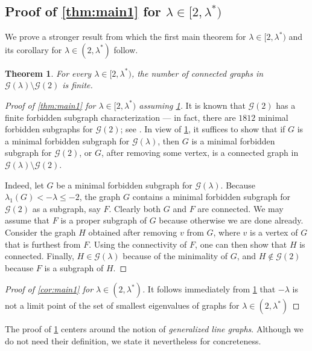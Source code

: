 \documentclass[11pt]{article}
\newtheorem{theorem}{Theorem}[section]
\theoremstyle{definition}
\theoremstyle{remark}
\newcommand{\la}{\lambda}
\newcommand{\G}{\mathcal{G}}
\newcommand{\Gl}{\G(\la)}
\begin{document}
\subsection{Proof of \texorpdfstring{\cref{thm:main1}}{the first main theorem} for \texorpdfstring{$\la \in [2, \la^*)$}{λ in [2, λ*)}} \label{sec:main1-2}

We prove a stronger result from which the first main theorem for $\la \in [2, \la^*)$ and its corollary for $\la \in (2,\la^*)$ follow.

\begin{theorem} \label{thm:main1-2}
    For every $\la \in [2, \la^*)$, the number of connected graphs in $\Gl \setminus \G(2)$ is finite.
\end{theorem}

\begin{proof}[Proof of \cref{thm:main1} for $\la \in [2, \la^*)$ assuming \cref{thm:main1-2}] \label{proof:main1-0}
    It is known that $\G(2)$ has a finite forbidden subgraph characterization --- in fact, there are $1812$ minimal forbidden subgraphs for $\G(2)$; see \cite{BN92}. In view of \cref{thm:main1-2}, it suffices to show that if $G$ is a minimal forbidden subgraph for $\Gl$, then $G$ is a minimal forbidden subgraph for $\G(2)$, or $G$, after removing some vertex, is a connected graph in $\Gl \setminus \G(2)$.
    
    Indeed, let $G$ be a minimal forbidden subgraph for $\Gl$. Because $\la_1(G) < -\la \le -2$, the graph $G$ contains a minimal forbidden subgraph for $\G(2)$ as a subgraph, say $F$. Clearly both $G$ and $F$ are connected. We may assume that $F$ is a proper subgraph of $G$ because otherwise we are done already. Consider the graph $H$ obtained after removing $v$ from $G$, where $v$ is a vertex of $G$ that is furthest from $F$. Using the connectivity of $F$, one can then show that $H$ is connected. Finally, $H \in \Gl$ because of the minimality of $G$, and $H \not\in \G(2)$ because $F$ is a subgraph of $H$.
\end{proof}

\begin{proof}[Proof of \cref{cor:main1} for $\la \in (2,\la^*)$]
    It follows immediately from \cref{thm:main1-2} that $-\la$ is not a limit point of the set of smallest eigenvalues of graphs for $\la \in (2,\la^*)$
\end{proof}

The proof of \cref{thm:main1-2} centers around the notion of \emph{generalized line graphs}. Although we do not need their definition, we state it nevertheless for concreteness.
\end{document}
